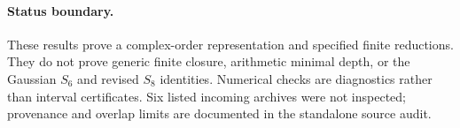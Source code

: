 \paragraph{Status boundary.}
These results prove a complex-order representation and specified finite
reductions. They do not prove generic finite closure, arithmetic minimal
depth, or the Gaussian $S_6$ and revised $S_8$ identities. Numerical checks
are diagnostics rather than interval certificates. Six listed incoming
archives were not inspected; provenance and overlap limits are documented
in the standalone source audit.
